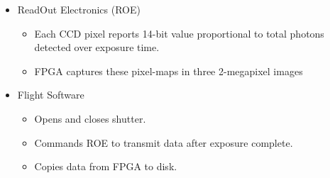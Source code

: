 \documentclass[landscape,xcolor={table},10pt]{beamer}
\begin{document}
\begin{frame}
\begin{columns}[T]
\begin{column}{.50\textwidth}
\begin{itemize}
		  		\item ReadOut Electronics (ROE)
				\begin{itemize}
			  		\item Each CCD pixel reports 14-bit value proportional to total photons detected over exposure time. 
			  		\item FPGA captures these pixel-maps in three 2-megapixel images
			  	\end{itemize}
		  		\item Flight Software
				\begin{itemize}
			  		\item Opens and closes shutter.
			  		\item Commands ROE to transmit data after exposure complete.
			  		\item Copies data from FPGA to disk.
			  	\end{itemize}
		  	\end{itemize}
		
		\end{column}%
		\end{columns}
		

	\end{frame}
	
\end{document}
